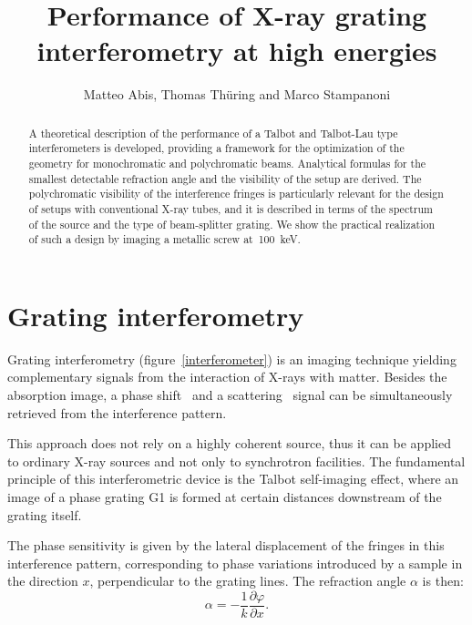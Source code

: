 \documentclass[a4paper]{spie}
\begin{document}
\title{Performance of X-ray grating interferometry at high energies}
\author{Matteo Abis, Thomas Th\"uring and Marco Stampanoni}
\renewcommand{\today}{}
\maketitle
\begin{abstract}
A theoretical description of the performance of a Talbot and Talbot-Lau
type interferometers is developed, providing a framework for the
optimization of the geometry for monochromatic and polychromatic
beams. Analytical formulas for the smallest
detectable refraction angle and the visibility of the setup are derived.
The polychromatic visibility of the interference fringes is particularly
relevant for the design of setups with conventional X-ray tubes, and it
is described in terms of the spectrum of the source and the type of
beam-splitter grating.
We show the practical realization of such a design by imaging a metallic
screw at~\SI{100}{\kilo\eV}.
\end{abstract}

\section{Grating interferometry}
Grating interferometry (figure~\ref{interferometer}) is an imaging technique yielding complementary
signals from the interaction of X-rays with matter. Besides the absorption
image, a phase shift~\cite{David2002,Momose2003a} and a
scattering~\cite{Pfeiffer2006} signal
can be simultaneously retrieved from the interference pattern.

This approach does not rely on a highly coherent source, thus it can be applied
to ordinary X-ray sources and not only to synchrotron facilities.
The fundamental principle of this interferometric device is the Talbot
self-imaging effect, where an image of a phase grating G1 is formed
at certain distances downstream of the grating itself.

The phase sensitivity is given by the lateral displacement of the fringes in this
interference pattern, corresponding to phase variations introduced by a
sample in the direction $x$, perpendicular to the grating lines. The
refraction angle $\alpha$ is then:
\begin{equation*}
    \alpha = -\frac{1}{k} \frac{\partial\varphi}{\partial
    x}.
\end{equation*}
\end{document}
